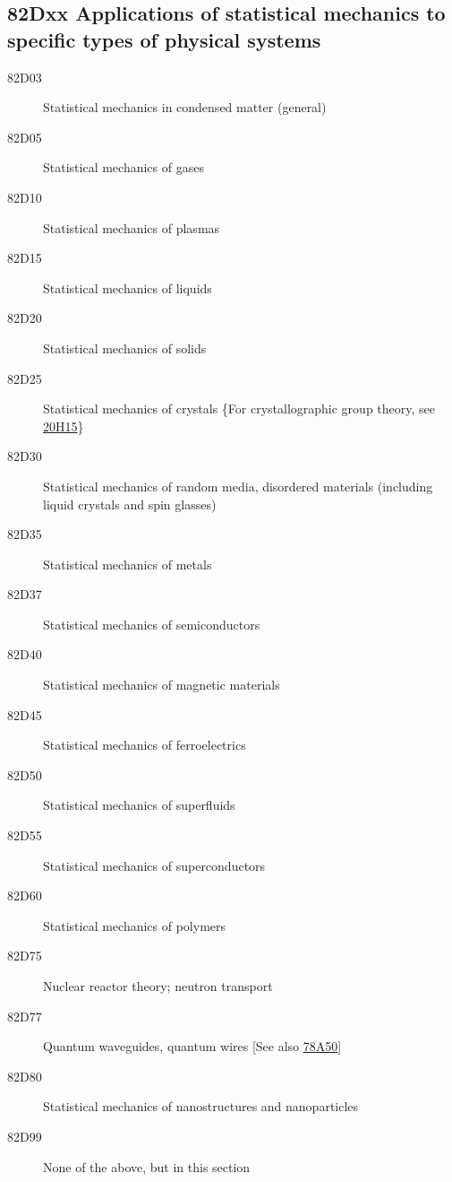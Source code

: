 \subsection*{82Dxx  Applications of statistical mechanics to specific types of physical systems }\label{82Dxx}
\begin{description}  
\item [82D03]\label{82D03} Statistical mechanics in condensed matter (general)
\item [82D05]\label{82D05} Statistical mechanics of gases
\item [82D10]\label{82D10} Statistical mechanics of plasmas
\item [82D15]\label{82D15} Statistical mechanics of liquids
\item [82D20]\label{82D20} Statistical mechanics of solids
\item [82D25]\label{82D25} Statistical mechanics of crystals \{For crystallographic group theory, see \hyperref[20H15]{20H15}\}
\item [82D30]\label{82D30} Statistical mechanics of random media, disordered materials (including liquid crystals and spin glasses)
\item [82D35]\label{82D35} Statistical mechanics of metals
\item [82D37]\label{82D37} Statistical mechanics of semiconductors
\item [82D40]\label{82D40} Statistical mechanics of magnetic materials
\item [82D45]\label{82D45} Statistical mechanics of ferroelectrics
\item [82D50]\label{82D50} Statistical mechanics of superfluids
\item [82D55]\label{82D55} Statistical mechanics of superconductors
\item [82D60]\label{82D60} Statistical mechanics of polymers
\item [82D75]\label{82D75} Nuclear reactor theory; neutron transport
\item [82D77]\label{82D77} Quantum waveguides, quantum wires [See also \hyperref[78A50]{78A50}]
\item [82D80]\label{82D80} Statistical mechanics of nanostructures and nanoparticles
\item [82D99]\label{82D99} None of the above, but in this section
\end{description}
